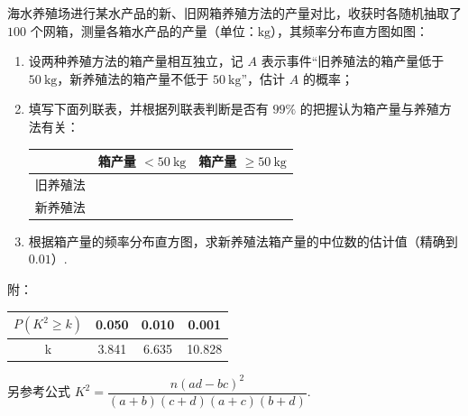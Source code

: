 \begin{problem}
海水养殖场进行某水产品的新、旧网箱养殖方法的产量对比，收获时各随机抽取了 \(100\text{ 个}\)网箱，测量各箱水产品的产量（单位：\(\mathrm{kg}\)），其频率分布直方图如图：

\begin{enumerate}
\item 设两种养殖方法的箱产量相互独立，记 \(A\) 表示事件“旧养殖法的箱产量低于 \(50 \mathrm{~kg}\)，新养殖法的箱产量不低于 \(50 \mathrm{~kg}\)”，估计 \(A\) 的概率；
\item 填写下面列联表，并根据列联表判断是否有 \(99\%\) 的把握认为箱产量与养殖方法有关：

\begin{center}
\begin{tabular}{c|cc}
& 箱产量 \(<50 \mathrm{~kg}\) & 箱产量 \(\ge 50 \mathrm{~kg}\)\\
\hline
旧养殖法 & &\\
新养殖法 & &
\end{tabular}
\end{center}

\item 根据箱产量的频率分布直方图，求新养殖法箱产量的中位数的估计值（精确到 \(0.01\)）.
\end{enumerate}


附：

\begin{center}
\begin{tabular}{c|ccc}
\(P(K^2\ge k)\) & 0.050 & 0.010 & 0.001\\
\hline
k & 3.841 & 6.635 & 10.828
\end{tabular}
\end{center}

另参考公式 \(K^2=\dfrac{n(ad-bc)^2}{(a+b)(c+d)(a+c)(b+d)}\).

\end{problem}

